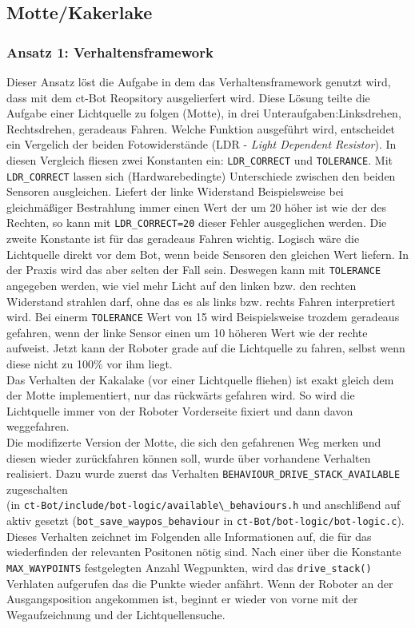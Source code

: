 \subsection{Motte/Kakerlake}
\label{motte_kakerlake}

\subsubsection{Ansatz 1: Verhaltensframework}

Dieser Ansatz löst die Aufgabe in dem das Verhaltensframework
genutzt wird, dass mit dem ct-Bot Reopsitory ausgelierfert wird.
Diese Lösung teilte die Aufgabe einer Lichtquelle zu folgen (Motte), in drei
Unteraufgaben:Linksdrehen, Rechtsdrehen, geradeaus Fahren.
Welche Funktion ausgeführt wird, entscheidet ein Vergelich der beiden Fotowiderstände
(LDR - \textit{Light Dependent Resistor}). In diesen Vergleich fliesen zwei Konstanten ein:
\verb+LDR_CORRECT+ und \verb+TOLERANCE+. Mit \verb+LDR_CORRECT+ lassen sich
(Hardwarebedingte) Unterschiede zwischen den beiden Sensoren ausgleichen. Liefert
der linke Widerstand Beispielsweise bei gleichmäßiger Bestrahlung immer einen
Wert der um 20 höher ist wie der des Rechten, so kann mit \verb+LDR_CORRECT=20+ dieser
Fehler ausgeglichen werden. Die zweite Konstante ist für das geradeaus Fahren wichtig.
Logisch wäre die Lichtquelle direkt vor dem Bot, wenn beide Sensoren den gleichen
Wert liefern. In der Praxis wird das aber selten der Fall sein. Deswegen kann mit
\verb+TOLERANCE+ angegeben werden, wie viel mehr Licht auf den linken bzw. den rechten
Widerstand strahlen darf, ohne das es als links bzw. rechts Fahren interpretiert wird.
Bei einerm \verb+TOLERANCE+ Wert von 15 wird Beispielsweise trozdem geradeaus gefahren,
wenn der linke Sensor einen um 10 höheren Wert wie der rechte aufweist. Jetzt kann
der Roboter grade auf die Lichtquelle zu fahren, selbst wenn diese nicht zu 100\%
vor ihm liegt. \\

Das Verhalten der Kakalake (vor einer Lichtquelle fliehen) ist exakt gleich dem der 
Motte implementiert, nur das rückwärts gefahren wird. So wird die Lichtquelle immer
von der Roboter Vorderseite fixiert und dann davon weggefahren. \\

Die modifizerte Version der Motte, die sich den gefahrenen Weg merken und diesen 
wieder zurückfahren können soll, wurde über vorhandene Verhalten realisiert.
Dazu wurde zuerst das Verhalten \verb+BEHAVIOUR_DRIVE_STACK_AVAILABLE+ zugeschalten \\
(in \verb+ct-Bot/include/bot-logic/available\_behaviours.h+ und anschlißend
auf aktiv gesetzt (\verb+bot_save_waypos_behaviour+ in
\verb+ct-Bot/bot-logic/bot-logic.c+). Dieses Verhalten zeichnet im Folgenden
alle Informationen auf, die für das wiederfinden der relevanten Positonen nötig sind.
Nach einer über die Konstante \verb+MAX_WAYPOINTS+ festgelegten Anzahl Wegpunkten,
wird das \verb+drive_stack()+ Verhlaten aufgerufen das die Punkte wieder anfährt.
Wenn der Roboter an der Ausgangsposition angekommen ist, beginnt er wieder von vorne mit
der Wegaufzeichnung und der Lichtquellensuche. \\

